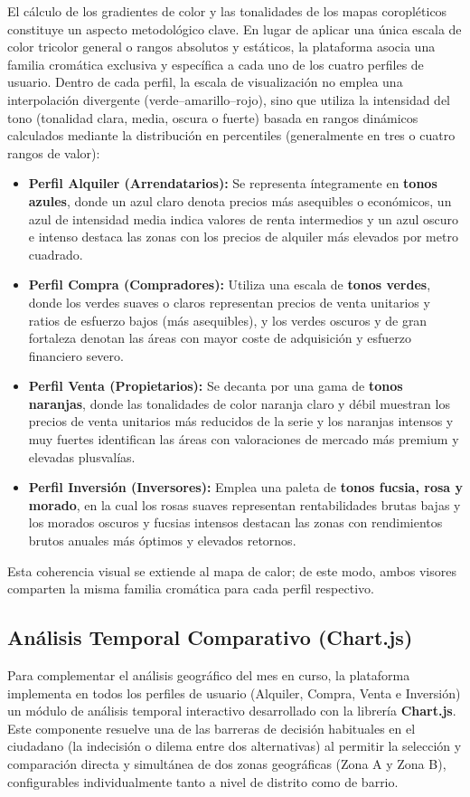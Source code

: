 \documentclass[a4paper,11pt,openany]{book}
\begin{document}
El cálculo de los gradientes de color y las tonalidades de los mapas coropléticos constituye un aspecto metodológico clave. En lugar de aplicar una única escala de color tricolor general o rangos absolutos y estáticos, la plataforma asocia una familia cromática exclusiva y específica a cada uno de los cuatro perfiles de usuario. Dentro de cada perfil, la escala de visualización no emplea una interpolación divergente (verde--amarillo--rojo), sino que utiliza la intensidad del tono (tonalidad clara, media, oscura o fuerte) basada en rangos dinámicos calculados mediante la distribución en percentiles (generalmente en tres o cuatro rangos de valor):
\begin{itemize}
    \item \textbf{Perfil Alquiler (Arrendatarios):} Se representa íntegramente en \textbf{tonos azules}, donde un azul claro denota precios más asequibles o económicos, un azul de intensidad media indica valores de renta intermedios y un azul oscuro e intenso destaca las zonas con los precios de alquiler más elevados por metro cuadrado.
    \item \textbf{Perfil Compra (Compradores):} Utiliza una escala de \textbf{tonos verdes}, donde los verdes suaves o claros representan precios de venta unitarios y ratios de esfuerzo bajos (más asequibles), y los verdes oscuros y de gran fortaleza denotan las áreas con mayor coste de adquisición y esfuerzo financiero severo.
    \item \textbf{Perfil Venta (Propietarios):} Se decanta por una gama de \textbf{tonos naranjas}, donde las tonalidades de color naranja claro y débil muestran los precios de venta unitarios más reducidos de la serie y los naranjas intensos y muy fuertes identifican las áreas con valoraciones de mercado más premium y elevadas plusvalías.
    \item \textbf{Perfil Inversión (Inversores):} Emplea una paleta de \textbf{tonos fucsia, rosa y morado}, en la cual los rosas suaves representan rentabilidades brutas bajas y los morados oscuros y fucsias intensos destacan las zonas con rendimientos brutos anuales más óptimos y elevados retornos.
\end{itemize}
Esta coherencia visual se extiende al mapa de calor; de este modo, ambos visores comparten la misma familia cromática para cada perfil respectivo.

\subsection{Análisis Temporal Comparativo (Chart.js)}
\label{subsec:analisis_temporal_chartjs}
Para complementar el análisis geográfico del mes en curso, la plataforma implementa en todos los perfiles de usuario (Alquiler, Compra, Venta e Inversión) un módulo de análisis temporal interactivo desarrollado con la librería \textbf{Chart.js}. Este componente resuelve una de las barreras de decisión habituales en el ciudadano (la indecisión o dilema entre dos alternativas) al permitir la selección y comparación directa y simultánea de dos zonas geográficas (Zona A y Zona B), configurables individualmente tanto a nivel de distrito como de barrio.
\end{document}
